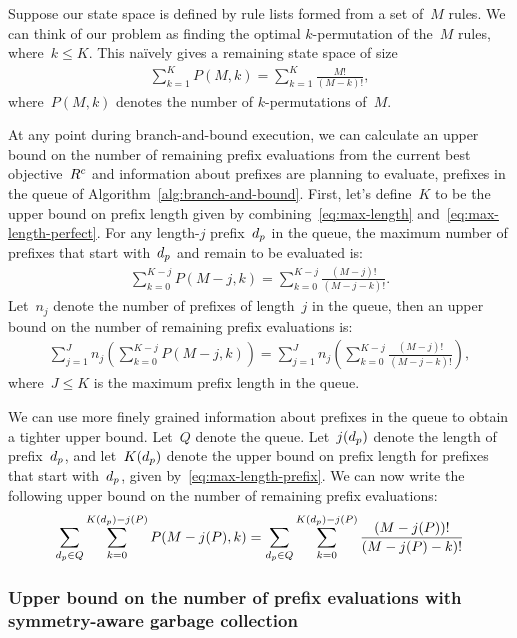 Suppose our state space is defined by rule lists formed from a set of~$M$ rules.
%
We can think of our problem as finding the optimal $k$-permutation of the~$M$ rules,
where~${k \le K}$.
%
This na\"ively gives a remaining state space of size
\begin{align}
\sum_{k=1}^K P(M, k) = \sum_{k=1}^K \frac{M!}{(M - k)!},
\label{eq:size-naive}
\end{align}
where~${P(M, k)}$ denotes the number of $k$-permutations of~$M$.

At any point during branch-and-bound execution, we can calculate an upper bound
on the number of remaining prefix evaluations from the current best objective~$R^c$
and information about prefixes are planning to evaluate,
\ie prefixes in the queue of Algorithm~\ref{alg:branch-and-bound}.
%
First, let's define~$K$ to be the upper bound on prefix length
given by combining~\eqref{eq:max-length} and~\eqref{eq:max-length-perfect}.
%
For any length-$j$ prefix~$d_p$ in the queue,
the maximum number of prefixes that start with~$d_p$ and remain to be evaluated is:
\begin{align}
\sum_{k=0}^{K-j} P(M-j, k) = \sum_{k=0}^{K-j} \frac{(M-j)!}{(M-j - k)!}.
\end{align}
Let~$n_j$ denote the number of prefixes of length~$j$ in the queue,
then an upper bound on the number of remaining prefix evaluations is:
\begin{align}
\sum_{j=1}^J n_j \left( \sum_{k=0}^{K-j} P(M-j, k) \right)
= \sum_{j=1}^J n_j \left( \sum_{k=0}^{K-j} \frac{(M-j)!}{(M-j - k)!} \right),
\end{align}
where~$J \le K$ is the maximum prefix length in the queue.

We can use more finely grained information about prefixes in the queue
to obtain a tighter upper bound.
%
Let~$Q$ denote the queue.
%
Let~$j(d_p)$ denote the length of prefix~$d_p$,
and let~$K(d_p)$ denote the upper bound on prefix length
for prefixes that start with~$d_p$, given by~\eqref{eq:max-length-prefix}.
%
We can now write the following upper bound on the number of remaining prefix evaluations:
\begin{align}
\sum_{\Prefix \in Q} \sum_{k=0}^{K(\Prefix) - j(P)} P(M - j(P), k)
= \sum_{\Prefix \in Q} \sum_{k=0}^{K(\Prefix) - j(P)} \frac{(M-j(P))!}{(M-j(P) - k)!}
\end{align}

\subsubsection{Upper bound on the number of prefix evaluations with symmetry-aware garbage collection}
\label{sec:permutation-counting}

